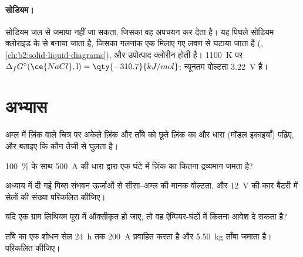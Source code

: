 \paragraph{सोडियम।} सोडियम जल से जमाया नहीं जा सकता, जिसका वह अपचयन कर देता है।
यह पिघले सोडियम क्लोराइड के  से बनाया जाता है, जिसका गलनांक
एक मिलाए गए लवण से घटाया जाता है (, \cref{ch:b2:solid-liquid-diagrams}),
और उपोत्पाद क्लोरीन होती है। \qty{1100}{K} पर $\Delta_f G^\circ(\ce{NaCl}, \text{l}) =
\qty{-310.7}{kJ/mol}$: न्यूनतम वोल्टता \qty{3.22}{V} है।

\section{अभ्यास}

\begin{exercise}[$\star$]\label{exo:b2:batteries-electrolysis:1}
अम्ल में ज़िंक वाले चित्र पर अकेले ज़िंक और ताँबे को छूते ज़िंक का  और
धारा (मॉडल इकाइयाँ) पढ़िए, और बताइए कि कौन
तेज़ी से घुलता है।
\end{exercise}

\begin{exercise}[$\star$]\label{exo:b2:batteries-electrolysis:2}
100~\%  के साथ \qty{500}{A} की धारा द्वारा एक घंटे में ज़िंक का
कितना द्रव्यमान जमता है?
\end{exercise}

\begin{exercise}[$\star$]\label{exo:b2:batteries-electrolysis:3}
अध्याय में दी गई गिब्स संभवन ऊर्जाओं से सीसा--अम्ल  की मानक
वोल्टता, और \qty{12}{V} की कार बैटरी में सेलों की संख्या
परिकलित कीजिए।
\end{exercise}

\begin{exercise}[$\star$]\label{exo:b2:batteries-electrolysis:4}
यदि एक ग्राम लिथियम पूरा  में ऑक्सीकृत हो जाए, तो वह ऐम्पियर-घंटों में
कितना आवेश दे सकता है?
\end{exercise}

\begin{exercise}[$\star\star$]\label{exo:b2:batteries-electrolysis:5}
ताँबे का एक शोधन सेल \qty{24}{h} तक \qty{200}{A} प्रवाहित करता है और
\qty{5.50}{kg} ताँबा जमाता है।  परिकलित कीजिए।
\end{exercise}

